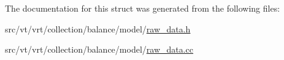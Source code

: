 The documentation for this struct was generated from the following files\+:\begin{DoxyCompactItemize}
\item 
src/vt/vrt/collection/balance/model/\hyperlink{raw__data_8h}{raw\+\_\+data.\+h}\item 
src/vt/vrt/collection/balance/model/\hyperlink{raw__data_8cc}{raw\+\_\+data.\+cc}\end{DoxyCompactItemize}
